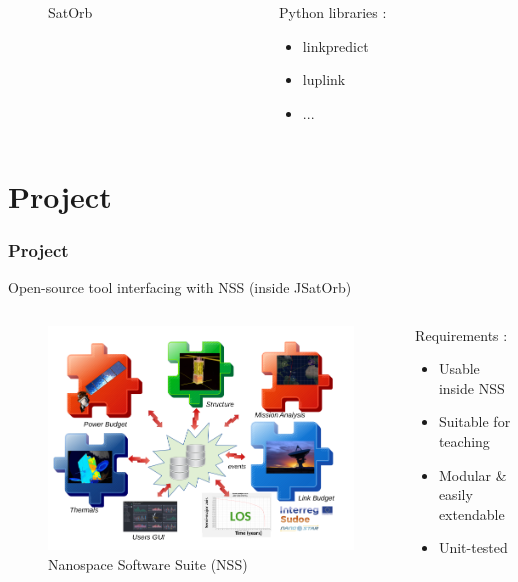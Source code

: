 \documentclass[11pt]{beamer}
\begin{document}
\begin{frame}
\begin{columns}[onlytextwidth]
\begin{column}{.32\textwidth}
\begin{figure}
				\caption{SatOrb}
			\end{figure}
		\end{column}
		\hfill
		\begin{column}{.28\textwidth}
			Python libraries : 
			\begin{itemize}
				\item linkpredict
				\item luplink
				\item ...
			\end{itemize}
		\end{column}
	\end{columns}
\end{frame}

\section{Project}

\begin{frame}
	\frametitle{Project}
	Open-source tool interfacing with NSS (inside JSatOrb)
	\begin{columns}[onlytextwidth]
		\begin{column}{.55\textwidth}
		\begin{figure}
			\includegraphics[width=.8\textwidth]{nss.png}
			\caption{Nanospace Software Suite (NSS)}
		\end{figure}
	\end{column}
	\hfill
	\begin{column}{.5\textwidth}
	Requirements : 
	\begin{itemize}
		\item Usable inside NSS
		\item Suitable for teaching
		\item Modular \& easily extendable
		\item Unit-tested
	\end{itemize}
	\end{column}
\end{columns}
\end{frame}
\end{document}
